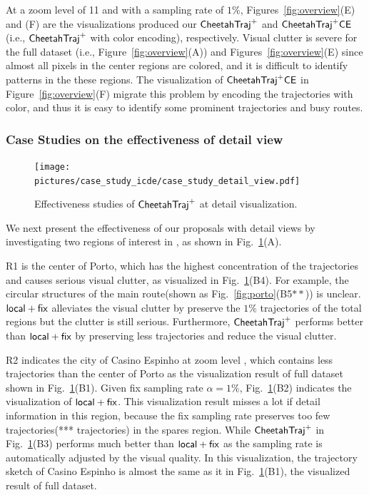 At a zoom level of 11 and with a sampling rate of $1\%$, Figures~\ref{fig:overview}(E) and (F) are the visualizations produced our $\mathsf{CheetahTraj}^{+}$ and $\mathsf{CheetahTraj}^{+}\mathsf{CE}$ (i.e., $\mathsf{CheetahTraj}^{+}$ with color encoding), respectively.
Visual clutter is severe for the full dataset (i.e., Figure~\ref{fig:overview}(A)) and Figures~\ref{fig:overview}(E) since almost all pixels in the center regions are colored, and it is difficult to identify patterns in the these regions. The visualization of $\mathsf{CheetahTraj}^{+}\mathsf{CE}$ in Figure~\ref{fig:overview}(F) migrate this problem by encoding the trajectories with color, and thus it is easy to identify some prominent trajectories and busy routes. 


\subsubsection{Case Studies on the effectiveness of detail view}\label{sec:detail}


\begin{figure}[t]
	\centering
	\texttt{[image: pictures/case\_study\_icde/case\_study\_detail\_view.pdf]}
	\vspace{-3mm}
	\caption{Effectiveness studies of $\mathsf{CheetahTraj}^{+}$ at detail visualization.}
	\label{fig:detailview}
	\vspace{-2mm}
\end{figure}

We next present the effectiveness of our proposals with detail views by investigating two regions of interest in \pt{}, as shown in Fig.~\ref{fig:detailview}(A). 


R1 is the center of Porto, which has the highest concentration of the trajectories and causes serious visual clutter, as visualized in Fig.~\ref{fig:detailview}(B4).
For example, the circular structures of the main route(shown as Fig.~\ref{fig:porto}(B5$**$)) is unclear.
$\mathsf{local+fix}$ alleviates the visual clutter by preserve the $1\%$ trajectories of the total regions but the clutter is still serious. Furthermore, $\mathsf{CheetahTraj}^{+}$ performs better than $\mathsf{local+fix}$ by preserving less trajectories and reduce the visual clutter. 


R2 indicates the city of Casino Espinho at zoom level \QM{**}, which contains less trajectories than the center of Porto as the visualization result of full dataset shown in Fig.~\ref{fig:detailview}(B1). 
Given fix sampling rate $\alpha=1\%$, Fig.~\ref{fig:detailview}(B2) indicates the visualization of $\mathsf{local+fix}$. This visualization result misses a lot if detail information in this region, because the fix sampling rate preserves too few trajectories(*** trajectories) in the spares region.
While $\mathsf{CheetahTraj}^{+}$ in Fig.~\ref{fig:detailview}(B3) performs much better than $\mathsf{local+fix}$ as the sampling rate is automatically adjusted by the visual quality. In this visualization, the trajectory sketch of Casino Espinho is almost the same as it in Fig.~\ref{fig:detailview}(B1), the visualized result of full dataset.


